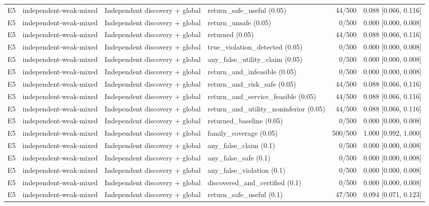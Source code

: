 \begin{longtable}{p{.04\linewidth}p{.18\linewidth}p{.19\linewidth}p{.16\linewidth}r p{.21\linewidth}}
E5 & independent-weak-mixed & Independent discovery + global & return\_safe\_useful (0.05) & 44/500 & 0.088 [0.066, 0.116]\\
E5 & independent-weak-mixed & Independent discovery + global & return\_unsafe (0.05) & 0/500 & 0.000 [0.000, 0.008]\\
E5 & independent-weak-mixed & Independent discovery + global & returned (0.05) & 44/500 & 0.088 [0.066, 0.116]\\
E5 & independent-weak-mixed & Independent discovery + global & true\_violation\_detected (0.05) & 0/500 & 0.000 [0.000, 0.008]\\
E5 & independent-weak-mixed & Independent discovery + global & any\_false\_utility\_claim (0.05) & 0/500 & 0.000 [0.000, 0.008]\\
E5 & independent-weak-mixed & Independent discovery + global & return\_and\_infeasible (0.05) & 0/500 & 0.000 [0.000, 0.008]\\
E5 & independent-weak-mixed & Independent discovery + global & return\_and\_risk\_safe (0.05) & 44/500 & 0.088 [0.066, 0.116]\\
E5 & independent-weak-mixed & Independent discovery + global & return\_and\_service\_feasible (0.05) & 44/500 & 0.088 [0.066, 0.116]\\
E5 & independent-weak-mixed & Independent discovery + global & return\_and\_utility\_noninferior (0.05) & 44/500 & 0.088 [0.066, 0.116]\\
E5 & independent-weak-mixed & Independent discovery + global & returned\_baseline (0.05) & 0/500 & 0.000 [0.000, 0.008]\\
E5 & independent-weak-mixed & Independent discovery + global & family\_coverage (0.05) & 500/500 & 1.000 [0.992, 1.000]\\
E5 & independent-weak-mixed & Independent discovery + global & any\_false\_claim (0.1) & 0/500 & 0.000 [0.000, 0.008]\\
E5 & independent-weak-mixed & Independent discovery + global & any\_false\_safe (0.1) & 0/500 & 0.000 [0.000, 0.008]\\
E5 & independent-weak-mixed & Independent discovery + global & any\_false\_violation (0.1) & 0/500 & 0.000 [0.000, 0.008]\\
E5 & independent-weak-mixed & Independent discovery + global & discovered\_and\_certified (0.1) & 0/500 & 0.000 [0.000, 0.008]\\
E5 & independent-weak-mixed & Independent discovery + global & return\_safe\_useful (0.1) & 47/500 & 0.094 [0.071, 0.123]\\

\end{longtable}
